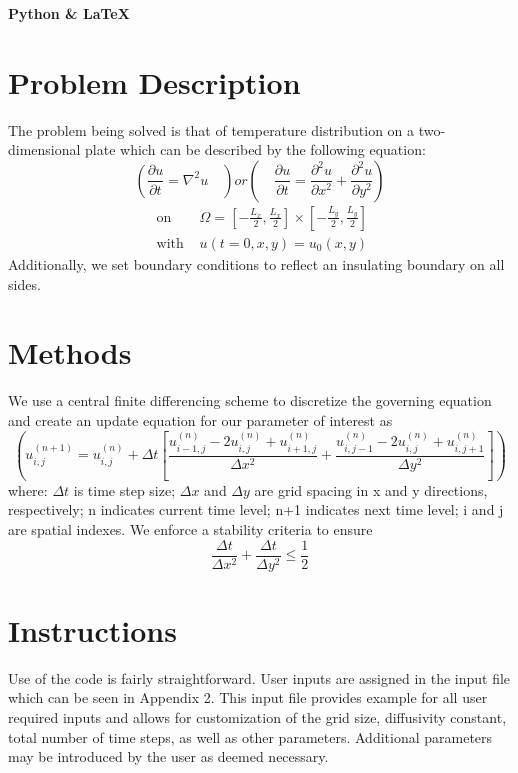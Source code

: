 \documentclass[12pt,letterpaper]{article}
\begin{document}
    
\begin{center}
    \textbf{\Large Python \& \LaTeX}
\end{center}
\section*{Problem Description}
The problem being solved is that of temperature distribution on a two-dimensional plate which can be described by the following equation:
\begin{equation}
    (\frac{\partial u}{\partial t}=\nabla^{2} u \quad) or (\quad \frac{\partial u}{\partial t}=\frac{\partial^{2} u}{\partial x^{2}}+\frac{\partial^{2} u}{\partial y^{2}})
\end{equation}
$$    
\begin{array}{ll}
{\text { on }} & {\Omega=\left[-\frac{L_{x}}{2}, \frac{L_{x}}{2}\right] \times\left[-\frac{L_{y}}{2}, \frac{L_{y}}{2}\right]} \\
{\text { with }} & {u(t=0, x, y)=u_{0}(x, y)}
\end{array}
$$
Additionally, we set boundary conditions to reflect an insulating boundary on all sides. 

\section*{Methods}
We use a central finite differencing scheme to discretize the governing equation and create an update equation for our parameter of interest as \begin{equation}
    (u_{i, j}^{(n+1)}=u_{i, j}^{(n)}+\Delta t\left[\frac{u_{i-1, j}^{(n)}-2 u_{i, j}^{(n)}+u_{i+1, j}^{(n)}}{\Delta x^{2}}+\frac{u_{i, j-1}^{(n)}-2 u_{i, j}^{(n)}+u_{i, j+1}^{(n)}}{\Delta y^{2}}\right])
\end{equation}
where: $\Delta t$ is time step size; $\Delta x$ and $\Delta y$ are grid spacing in x and y directions, respectively;
n indicates current time level; n+1 indicates next time level; i and j are spatial indexes. We enforce a stability criteria to ensure 
\begin{equation}
    \frac{\Delta t}{\Delta x^{2}}+\frac{\Delta t}{\Delta y^{2}} \leq \frac{1}{2}
\end{equation}
\section*{Instructions}
Use of the code is fairly straightforward. User inputs are assigned in the input file which can be seen in Appendix 2. This input file provides example for all user required inputs and allows for customization of the grid size, diffusivity constant, total number of time steps, as well as other parameters. Additional parameters may be introduced by the user as deemed necessary. 
\end{document}
